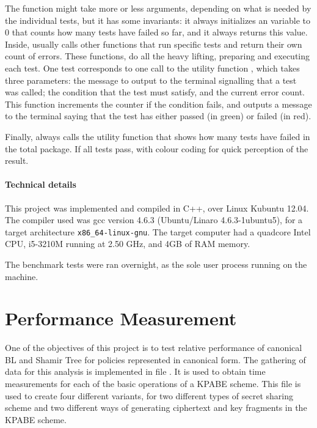 \documentclass{article}
\begin{document}
The function  might take more or less arguments, depending on what is needed by the individual tests, but it has some invariants: it always initializes an variable  to $0$ that counts how many tests have failed so far, and it always returns this value. Inside,  usually calls other functions that run specific tests and return their own count of errors. These functions, do all the heavy lifting, preparing and executing each test. One test corresponds to one call to the utility function , which takes three parameters: the message to output to the terminal signalling that a test was called; the condition that the test must satisfy, and the current error count. This function increments the counter if the condition fails, and outputs a message to the terminal saying that the test has either passed (in green) or failed (in red). 

Finally,  always calls the utility function  that shows how many tests have failed in the total package. If all tests pass, with colour coding for quick perception of the result.

\paragraph{Technical details}
This project was implemented and compiled in C++, over Linux Kubuntu 12.04.  The compiler used was gcc version 4.6.3 (Ubuntu/Linaro 4.6.3-1ubuntu5), for a target architecture \verb|x86_64-linux-gnu|. The target computer had a quadcore Intel CPU, i5-3210M running at 2.50 GHz, and 4GB of RAM memory.

The benchmark tests were ran overnight, as the sole user process running on the machine.


\section{Performance Measurement}

One of the objectives of this project is to test relative performance of canonical BL and Shamir Tree for policies represented in canonical form. The gathering of data for this analysis is implemented in file . It is used to obtain time measurements for each of the basic operations of a KPABE scheme. This file is used to create four different variants, for two different types of secret sharing scheme and two different ways of generating ciphertext and key fragments in the KPABE scheme. 
\end{document}
